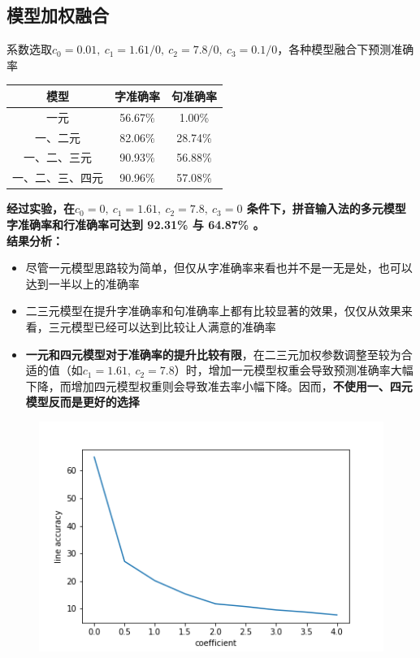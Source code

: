 \documentclass{article}
\begin{document}
\begin{spacing}{1.1}
	\subsection{模型加权融合}
	\hspace{1.4em}
	系数选取$c_0=0.01,\ c_1=1.61/0,\ c_2=7.8/0,\ c_3=0.1/0$，各种模型融合下预测准确率
	\begin {center}
	\begin{tabular}{|c|c|c|}
		\textbf{模型} & \textbf{字准确率} & \textbf{句准确率}\\
		\hline
		一元 & 56.67\% & 1.00\% \\
		\hline
		一、二元  & 82.06\% & 28.74\%\\
		\hline
		一、二、三元 & 90.93\% & 56.88\% \\
		\hline
		一、二、三、四元 & 90.96\% & 57.08\% \\
	\end{tabular}
	\end{center}
	\hspace{1.4em}
	\textbf{经过实验，在$c_0=0,\ c_1=1.61,\ c_2=7.8,\ c_3=0$ 条件下，拼音输入法的多元模型字准确率和行准确率可达到 92.31\% 与 64.87\% 。}
	\\\textbf{结果分析：}
	\begin{itemize}
		\item 尽管一元模型思路较为简单，但仅从字准确率来看也并不是一无是处，也可以达到一半以上的准确率
		\item 二三元模型在提升字准确率和句准确率上都有比较显著的效果，仅仅从效果来看，三元模型已经可以达到比较让人满意的准确率
		\item \textbf{一元和四元模型对于准确率的提升比较有限}，在二三元加权参数调整至较为合适的值（如$ c_1=1.61,\ c_2=7.8$）时，增加一元模型权重会导致预测准确率大幅下降，而增加四元模型权重则会导致准去率小幅下降。因而，\textbf{不使用一、四元模型反而是更好的选择}
	\end{itemize}
\begin{figure}[h]
	\centering
	\begin{minipage}{0.2\linewidth}
		\centering
		\includegraphics[width=1\linewidth]{pic/accuracy03.png}

\end{minipage}
\end{figure}
\end{spacing}
\end{document}

